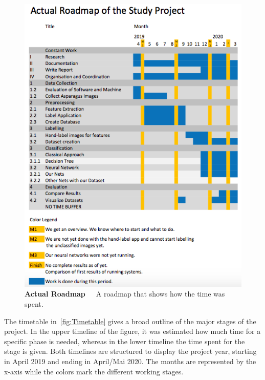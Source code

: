 \begin{figure}[h]
	\centering
	\includegraphics[scale=0.7]{Figures/chapter02/roadmap_actual.png}
	\decoRule
	\caption[Actual Roadmap]{\textbf{Actual Roadmap}~~~A roadmap that shows how the time was spent.}
	\label{fig:RoadmapActual}
\end{figure}

The timetable in~\autoref{fig:Timetable} gives a broad outline of the major stages of the project. In the upper timeline of the figure, it was estimated how much time for a specific phase is needed, whereas in the lower timeline the time spent for the stage is given. Both timelines are structured to display the project year, starting in April 2019 and ending in April/Mai 2020. The months are represented by the x-axis while the colors mark the different working stages.

